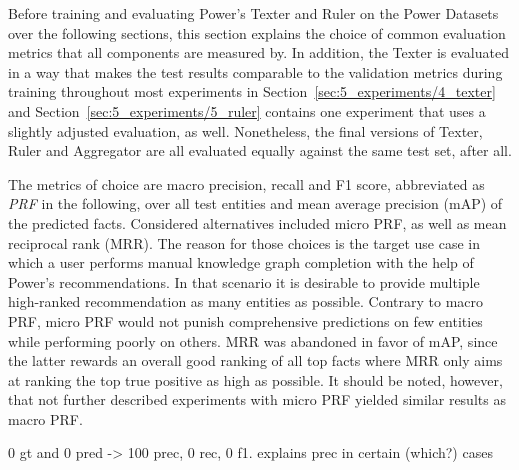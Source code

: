 Before training and evaluating Power's Texter and Ruler on the Power Datasets over the following sections, this section explains the choice of common evaluation metrics that all components are measured by. In addition, the Texter is evaluated in a way that makes the test results comparable to the validation metrics during training throughout most experiments in Section~\ref{sec:5_experiments/4_texter} and Section~\ref{sec:5_experiments/5_ruler} contains one experiment that uses a slightly adjusted evaluation, as well. Nonetheless, the final versions of Texter, Ruler and Aggregator are all evaluated equally against the same test set, after all.

The metrics of choice are macro precision, recall and F1 score, abbreviated as \emph{PRF} in the following, over all test entities and mean average precision (mAP) of the predicted facts. Considered alternatives included micro PRF, as well as mean reciprocal rank (MRR). The reason for those choices is the target use case in which a user performs manual knowledge graph completion with the help of Power's recommendations. In that scenario it is desirable to provide multiple high-ranked recommendation as many entities as possible. Contrary to macro PRF, micro PRF would not punish comprehensive predictions on few entities while performing poorly on others. MRR was abandoned in favor of mAP, since the latter rewards an overall good ranking of all top facts where MRR only aims at ranking the top true positive as high as possible. It should be noted, however, that not further described experiments with micro PRF yielded similar results as macro PRF.

0 gt and 0 pred -> 100 prec, 0 rec, 0 f1. explains prec in certain (which?) cases
